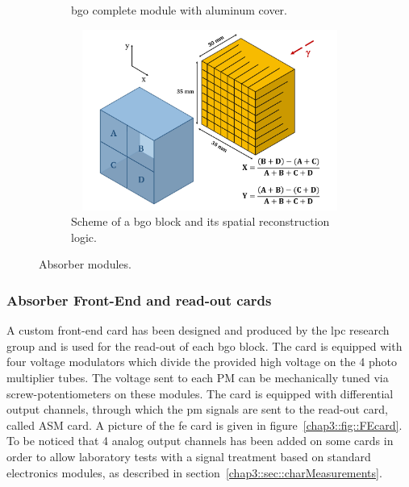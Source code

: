 \begin{figure}
\begin{subfigure}[b]{.5\textwidth}
\caption{\gls{bgo} complete module with aluminum cover.}
\label{chap3::fig::originalBlock_withAl}
\end{subfigure}
\begin{subfigure}[b]{.5\textwidth}
\centering
\includegraphics[width=1\textwidth, height=16em]{03_GraphicFiles/chapter3_CLaRySproto/Absorber/block_scheme.pdf}
\caption{Scheme of a \gls{bgo} block and its spatial reconstruction logic.}
\label{chap3::fig::BGOblockScheme} 
\end{subfigure}
\caption{Absorber modules.}
\label{chap5::fig::BGO_block}
\end{figure}


\subsubsection{Absorber Front-End and read-out cards}\label{chap3::subsubsec::AbsorberFEcard}

A custom front-end card has been designed and produced by the \gls{lpc} research group and is used for the read-out of each \gls{bgo} block. The card is equipped with four voltage modulators which divide the provided high voltage on the 4 photo multiplier tubes. The voltage sent to each \gls{PM} can be mechanically tuned via screw-potentiometers on these modules. The card is equipped with differential output channels, through which the \gls{pm} signals are sent to the read-out card, called ASM card. A picture of the \gls{fe} card is given in figure~\ref{chap3::fig::FEcard}. To be noticed that 4 analog output channels has been added on some cards in order to allow laboratory tests with a signal treatment based on standard electronics modules, as described in section~\ref{chap3::sec::charMeasurements}. 

